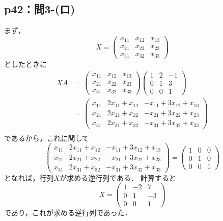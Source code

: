 \documentclass[a4paper,10pt,fleqn]{ltjsarticle}
\begin{document}
\subsection*{p42：問3-(ロ)}

\begin{leftbar}
    まず，
    \[
        X= \begin{pmatrix} x_{11} & x_{12} & x_{13} \\x_{21} & x_{22} & x_{23} \\x_{31} & x_{32} & x_{33}  \end{pmatrix}
    \]
    としたときに
    \begin{align*}
        XA & =  \begin{pmatrix} x_{11} & x_{12} & x_{13} \\x_{21} & x_{22} & x_{23} \\x_{31} & x_{32} & x_{33}  \end{pmatrix}
        \begin{pmatrix} 1 & 2 & -1 \\ 0& 1 & 3 \\ 0 & 0 & 1 \end{pmatrix}                                                                                                                                          \\
           & = \begin{pmatrix} x_{11} & 2x_{11} + x_{12} & -x_{11} +3x_{12} +x_{13} \\ x_{21} & 2x_{21} + x_{22} & -x_{21} +3x_{22} +x_{23} \\  x_{31} & 2x_{31} + x_{32} & -x_{31} +3x_{32} +x_{33} \end{pmatrix} \\
    \end{align*}
    であるから，これに関して
    \[
        \begin{pmatrix} x_{11} & 2x_{11} + x_{12} & -x_{11} +3x_{12} +x_{13} \\ x_{21} & 2x_{21} + x_{22} & -x_{21} +3x_{22} +x_{23} \\  x_{31} & 2x_{31} + x_{32} & -x_{31} +3x_{32} +x_{33} \end{pmatrix} = \begin{pmatrix} 1 & 0 & 0 \\ 0 & 1 & 0 \\ 0 & 0 & 1 \end{pmatrix}
    \]
    となれば，行列$X$が求める逆行列である．
    計算すると
    \[
        X = \begin{pmatrix} 1 & -2 & 7 \\ 0 & 1 & -3 \\ 0 & 0 & 1 \end{pmatrix}
    \]
    であり，これが求める逆行列であった．
\end{leftbar}
\end{document}
